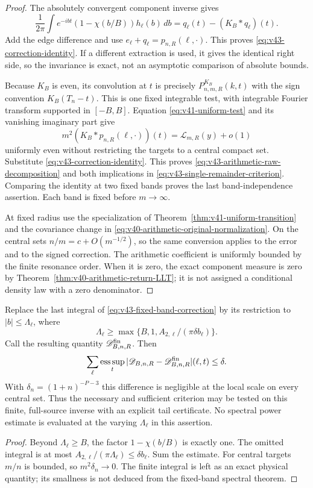 \begin{proof}
The absolutely convergent component inverse gives
\[
 \frac1{2\pi}\int e^{-ibt}(1-\chi(b/B))h_\ell(b)\,db
                    =q_\ell(t)-(K_B*q_\ell)(t).
\]
Add the edge difference and use $e_\ell+q_\ell=p_{n,R}(\ell,\cdot)$.
This proves \eqref{eq:v43-correction-identity}. If a different
extraction is used, it gives the identical right side, so the
invariance is exact, not an asymptotic comparison of absolute bounds.

Because $K_B$ is even, its convolution at $t$ is precisely
$P^{K_B}_{n,m,R}(k,t)$ with the sign convention
$K_B(T_n-t)$. This is one fixed integrable test, with integrable
Fourier transform supported in $[-B,B]$. Equation
\eqref{eq:v41-uniform-test} and its vanishing imaginary part give
\[
 m^2(K_B*p_{n,R}(\ell,\cdot))(t)=\mathcal L_{m,R}(y)+o(1)
\]
uniformly even without restricting the targets to a central compact
set. Substitute \eqref{eq:v43-correction-identity}. This proves
\eqref{eq:v43-arithmetic-raw-decomposition} and both implications in
\eqref{eq:v43-single-remainder-criterion}. Comparing the identity at
two fixed bands proves the last band-independence assertion. Each
band is fixed before $m\to\infty$.

At fixed radius use the specialization of
Theorem~\ref{thm:v41-uniform-transition} and the covariance change in
\eqref{eq:v40-arithmetic-original-normalization}. On the central
sets $n/m=c+O(m^{-1/2})$, so the same conversion applies to the error
and to the signed correction. The arithmetic coefficient is uniformly
bounded by the finite resonance order. When it is zero, the exact
component measure is zero by
Theorem~\ref{thm:v40-arithmetic-return-LLT}; it is not assigned a
conditional density law with a zero denominator.
\end{proof}

\begin{corollary}
\label{cor:v43-finite-remainder-certificate}
Replace the last integral of \eqref{eq:v43-fixed-band-correction} by
its restriction to $|b|\le\Lambda_\ell$, where
\[
 \Lambda_\ell\ge\max\{B,1,A_{2,\ell}/(\pi\delta b_\ell)\}.
\]
Call the resulting quantity $\mathscr D^{\rm fin}_{B,n,R}$. Then
\[
 \sum_\ell\operatorname*{ess\,sup}_t
       |\mathscr D_{B,n,R}-\mathscr D^{\rm fin}_{B,n,R}|(\ell,t)
                         \le\delta.
\]
With $\delta_n=(1+n)^{-P-3}$ this difference is negligible at the
local scale on every central set. Thus the necessary and sufficient
criterion may be tested on this finite, full-source inverse with an
explicit tail certificate. No spectral power estimate is evaluated
at the varying $\Lambda_\ell$ in this assertion.
\end{corollary}
\begin{proof}
Beyond $\Lambda_\ell\ge B$, the factor $1-\chi(b/B)$ is exactly
one. The omitted integral is at most
$A_{2,\ell}/(\pi\Lambda_\ell)\le\delta b_\ell$. Sum the estimate.
For central targets $m/n$ is bounded, so $m^2\delta_n\to0$.
The finite integral is left as an exact physical quantity; its smallness
is not deduced from the fixed-band spectral theorem.
\end{proof}

